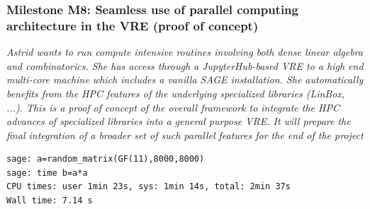\documentclass{beamer}
\begin{document}
\begin{frame}[fragile]
  \frametitle{Milestone M8: Seamless use of parallel computing architecture in the VRE (proof of concept)}

{\footnotesize  \textit{Astrid wants to run compute intensive routines involving both dense linear algebra and combinatorics. She has access through a JupyterHub-based VRE to a high end multi-core machine which includes a vanilla SAGE installation.
She automatically benefits from the HPC features of the underlying specialized libraries (LinBox, ...). This is a proof of concept of the overall framework to integrate the HPC advances of specialized libraries into a general purpose VRE. It will prepare the final integration of a broader set of such parallel features for the end of the project}


\begin{verbatim}
sage: a=random_matrix(GF(11),8000,8000)
sage: time b=a*a
CPU times: user 1min 23s, sys: 1min 14s, total: 2min 37s
Wall time: 7.14 s
\end{verbatim}
}

\end{frame}
\end{document}
